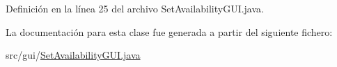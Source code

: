 Definición en la línea 25 del archivo Set\+Availability\+G\+U\+I.\+java.



La documentación para esta clase fue generada a partir del siguiente fichero\+:\begin{DoxyCompactItemize}
\item 
src/gui/\mbox{\hyperlink{_set_availability_g_u_i_8java}{Set\+Availability\+G\+U\+I.\+java}}\end{DoxyCompactItemize}

